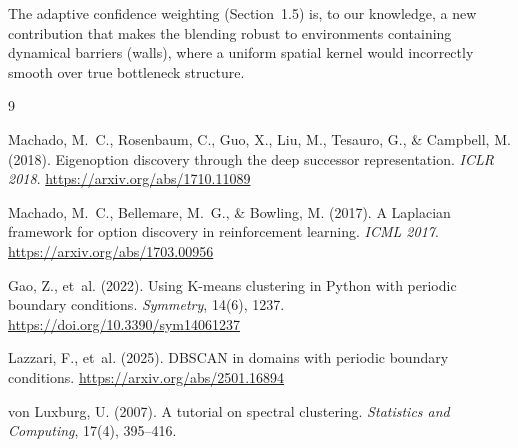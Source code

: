 \documentclass[11pt,a4paper]{article}
\begin{document}
The adaptive confidence weighting (Section~1.5) is, to our knowledge, a
new contribution that makes the blending robust to environments
containing dynamical barriers (walls), where a uniform spatial kernel
would incorrectly smooth over true bottleneck structure.

\begin{thebibliography}{9}

Machado, M.~C., Rosenbaum, C., Guo, X., Liu, M., Tesauro, G., \&
Campbell, M. (2018).
Eigenoption discovery through the deep successor representation.
\emph{ICLR 2018}.
\url{https://arxiv.org/abs/1710.11089}

Machado, M.~C., Bellemare, M.~G., \& Bowling, M. (2017).
A Laplacian framework for option discovery in reinforcement learning.
\emph{ICML 2017}.
\url{https://arxiv.org/abs/1703.00956}

Gao, Z., et~al. (2022).
Using K-means clustering in Python with periodic boundary conditions.
\emph{Symmetry}, 14(6), 1237.
\url{https://doi.org/10.3390/sym14061237}

Lazzari, F., et~al. (2025).
DBSCAN in domains with periodic boundary conditions.
\url{https://arxiv.org/abs/2501.16894}

von Luxburg, U. (2007).
A tutorial on spectral clustering.
\emph{Statistics and Computing}, 17(4), 395--416.

\end{thebibliography}
\end{document}
